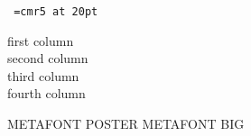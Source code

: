 \documentclass[a4paper]{report}
\begin{document}
\pagestyle{empty}
\tt       %
\font\tinyfont=cmr5 at 20pt

\scriptsize

\begin{multicols}{4}
\raggedcolumns
\noindent
\begin{tabbing}



first column \\  %

second column \\

third column \\

fourth column

    
\end{tabbing}
\end{multicols}
\noindent
\vspace{.5cm}
\hrulefill
\vspace{2cm}


\noindent 
 \begin{center}
METAFONT POSTER
\tinyfont
METAFONT BIG
\end{center}
\end{document}

